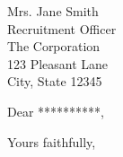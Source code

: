 \documentclass[a4paper, 11pt]{letter}
\date{\today}
\begin{document}
\begin{letter}{Mrs. Jane Smith \\
			   Recruitment Officer \\
		   	   The Corporation \\
               123 Pleasant Lane \\
               City, State 12345} 

\opening{Dear **********,} 
 
\lipsum[1-25]

\closing{Yours faithfully, \\
     \\ 
}


\end{letter}
\end{document}

